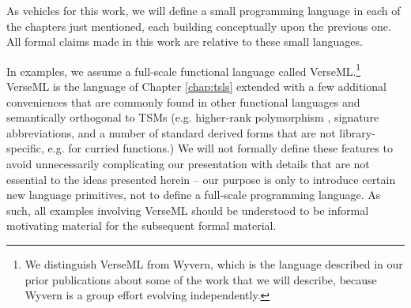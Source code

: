 As vehicles for this work, we will define a small programming language in each of the chapters just mentioned, each building conceptually upon the previous one. All formal claims made in this work are relative to these small languages.

In examples, we assume a full-scale functional language called VerseML.\footnote{We distinguish VerseML from Wyvern, which is the language described in our prior publications about some of the work that we will describe, because Wyvern is a group effort evolving independently.} VerseML is the language of Chapter \ref{chap:tsls}  extended with a few additional conveniences that are commonly found in other functional languages and semantically orthogonal to TSMs (e.g. higher-rank polymorphism \cite{conf/icfp/DunfieldK13}, signature abbreviations, and a number of standard derived forms that are not library-specific, e.g. for curried functions.) %
We will not formally define these features to avoid unnecessarily complicating our presentation with details that are not essential to the ideas presented herein -- our purpose is only to introduce certain new language primitives, not to define a full-scale programming language. As such, all examples involving VerseML should be understood to be informal motivating material for the subsequent formal material. %

